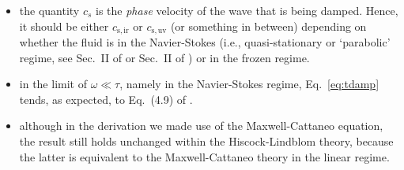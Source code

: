 \documentclass[aps,prd,twocolumn,a4paper,floatfix,nofootbib,superscriptaddress,nofootinbib]{revtex4}
\begin{document}
\begin{itemize}
%
\item the quantity $c_s$ is the \textit{phase} velocity of the wave that is
being damped. Hence, it should be either $c_\mathrm{s,ir}$ or $c_\mathrm{s,uv}$ (or something
in between) depending on whether the fluid is in the Navier-Stokes (i.e., quasi-stationary or `parabolic' regime, see
Sec.~II of \citet{Gavassino21bulk} or Sec.~II of \citet{Camelio22a}) or in
the frozen regime.
%
\item in the limit of $\omega\ll\tau$, namely in the Navier-Stokes regime,
Eq.~\eqref{eq:tdamp} tends, as expected, to Eq.~(4.9) of \citet{Kovtun19}.
%
\item although in the derivation we made use of the Maxwell-Cattaneo equation,
the result still holds unchanged within the Hiscock-Lindblom theory, because
the latter is equivalent to the Maxwell-Cattaneo theory in the linear regime.
%
\end{itemize}
\end{document}
